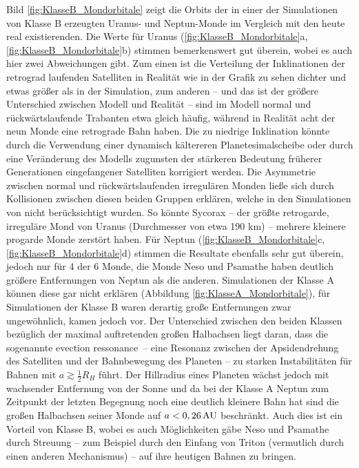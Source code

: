 \documentclass[12pt,a4paper,twoside]{article}
\renewcommand{\cite}{\citep}
\begin{document}
Bild \ref{fig:KlasseB_Mondorbitale} zeigt die Orbits der in einer der Simulationen von Klasse B erzeugten Uranus- und Neptun-Monde im Vergleich mit den heute real existierenden.
Die Werte für Uranus (\ref{fig:KlasseB_Mondorbitale}a, \ref{fig:KlasseB_Mondorbitale}b) stimmen bemerkenswert gut überein, wobei es auch hier zwei Abweichungen gibt.
Zum einen ist die Verteilung der Inklinationen der retrograd laufenden Satelliten in Realität wie in der Grafik zu sehen dichter und etwas größer als in der Simulation, 
zum anderen – und das ist der größere Unterschied zwischen Modell und Realität – sind im Modell normal und rückwärtslaufende Trabanten etwa gleich häufig, während in Realität acht der neun Monde eine retrograde Bahn haben\cite{Nesvorny2007}.
Die zu niedrige Inklination könnte durch die Verwendung einer dynamisch kältereren Planetesimalscheibe oder durch eine Veränderung des Modells zugunsten der stärkeren Bedeutung früherer Generationen eingefangener Satelliten korrigiert werden\cite{Nesvorny2007}.
Die Asymmetrie zwischen normal und rückwärtslaufenden irregulären Monden ließe sich durch Kollisionen zwischen diesen beiden Gruppen erklären, welche in den Simulationen von \cite{Nesvorny2007} nicht berücksichtigt wurden. So könnte Sycorax – der größte retrogarde, irreguläre Mond von Uranus (Durchmesser von etwa 190 km) – mehrere kleinere progarde Monde zerstört haben\cite{Nesvorny2007}.
Für Neptun (\ref{fig:KlasseB_Mondorbitale}c, \ref{fig:KlasseB_Mondorbitale}d) stimmen die Resultate ebenfalls sehr gut überein, jedoch nur für 4 der 6 Monde, die Monde Neso und Psamathe haben deutlich größere Entfernungen von Neptun als die anderen\cite{Nesvorny2007}.
Simulationen der Klasse A können diese gar nicht erklären (Abbildung \ref{fig:KlasseA_Mondorbitale}), für Simulationen der Klasse B waren derartig große Entfernungen zwar ungewöhnlich, kamen jedoch vor.
Der Unterschied zwischen den beiden Klassen bezüglich der maximal auftretenden großen Halbachsen liegt daran, dass die sogenannte \glqq evection ressonance\grqq\ -- eine Resonanz zwischen der Apsidendrehung des Satelliten und der Bahnbewegung des Planeten -- zu starken Instabilitäten für Bahnen mit $a \gtrsim \frac{1}{2} R_H$ führt\cite{Nesvorny2003,Nesvorny2007}.
Der Hillradius eines Planeten wächst jedoch mit wachsender Entfernung von der Sonne und da bei der Klasse A Neptun zum Zeitpunkt der letzten Begegnung noch eine deutlich kleinere Bahn hat sind die großen Halbachsen seiner Monde auf $a < \unit[0,26]{AU}$ beschränkt\cite{Nesvorny2007}.
Auch dies ist ein Vorteil von Klasse B, wobei es auch Möglichkeiten gäbe Neso und Psamathe durch Streuung – zum Beispiel durch den Einfang von Triton (vermutlich durch einen anderen Mechanismus) – auf ihre heutigen Bahnen zu bringen. %
\end{document}

